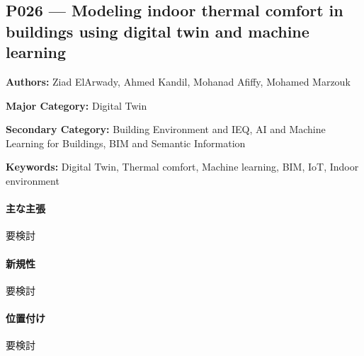 \subsection{P026 --- Modeling indoor thermal comfort in buildings using digital twin and machine learning}
\label{paper:P026}
\textbf{Authors:} Ziad ElArwady, Ahmed Kandil, Mohanad Afiffy, Mohamed Marzouk\par
\textbf{Major Category:} Digital Twin\par
\textbf{Secondary Category:} Building Environment and IEQ, AI and Machine Learning for Buildings, BIM and Semantic Information\par
\textbf{Keywords:} Digital Twin, Thermal comfort, Machine learning, BIM, IoT, Indoor environment\par
\paragraph{主な主張}
要検討 \cite{ElArwady:2024ThermalComfortDT}
\paragraph{新規性}
要検討
\paragraph{位置付け}
要検討
